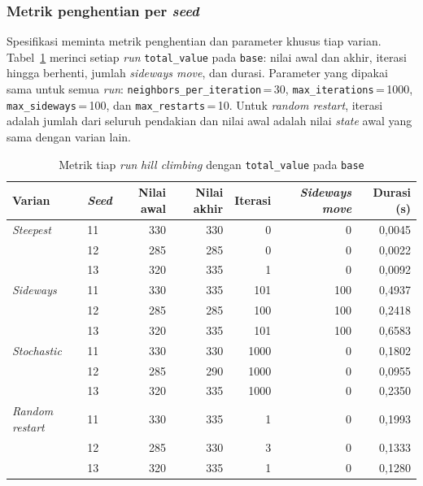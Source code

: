 \subsubsection{Metrik penghentian per \textit{seed}}
Spesifikasi meminta metrik penghentian dan parameter khusus tiap varian. Tabel~\ref{tab:hc-metrik-base} merinci setiap \textit{run} \texttt{total\_value} pada \texttt{base}: nilai awal dan akhir, iterasi hingga berhenti, jumlah \textit{sideways move}, dan durasi. Parameter yang dipakai sama untuk semua \textit{run}: \texttt{neighbors\_per\_iteration}\,=\,30, \texttt{max\_iterations}\,=\,1000, \texttt{max\_sideways}\,=\,100, dan \texttt{max\_restarts}\,=\,10. Untuk \textit{random restart}, iterasi adalah jumlah dari seluruh pendakian dan nilai awal adalah nilai \textit{state} awal yang sama dengan varian lain.

\begin{table}[H]
    \centering
    \small
    \begin{tabular}{@{}llrrrrr@{}}
        \toprule
        Varian & \textit{Seed} & Nilai awal & Nilai akhir & Iterasi & \textit{Sideways move} & Durasi (s) \\
        \midrule
        \textit{Steepest} & 11 & 330 & 330 & 0 & 0 & 0,0045 \\
         & 12 & 285 & 285 & 0 & 0 & 0,0022 \\
         & 13 & 320 & 335 & 1 & 0 & 0,0092 \\
        \midrule
        \textit{Sideways} & 11 & 330 & 335 & 101 & 100 & 0,4937 \\
         & 12 & 285 & 285 & 100 & 100 & 0,2418 \\
         & 13 & 320 & 335 & 101 & 100 & 0,6583 \\
        \midrule
        \textit{Stochastic} & 11 & 330 & 330 & 1000 & 0 & 0,1802 \\
         & 12 & 285 & 290 & 1000 & 0 & 0,0955 \\
         & 13 & 320 & 335 & 1000 & 0 & 0,2350 \\
        \midrule
        \textit{Random restart} & 11 & 330 & 335 & 1 & 0 & 0,1993 \\
         & 12 & 285 & 330 & 3 & 0 & 0,1333 \\
         & 13 & 320 & 335 & 1 & 0 & 0,1280 \\
        \bottomrule
    \end{tabular}
    \caption{Metrik tiap \textit{run} \textit{hill climbing} dengan \texttt{total\_value} pada \texttt{base}}
    \label{tab:hc-metrik-base}
\end{table}

